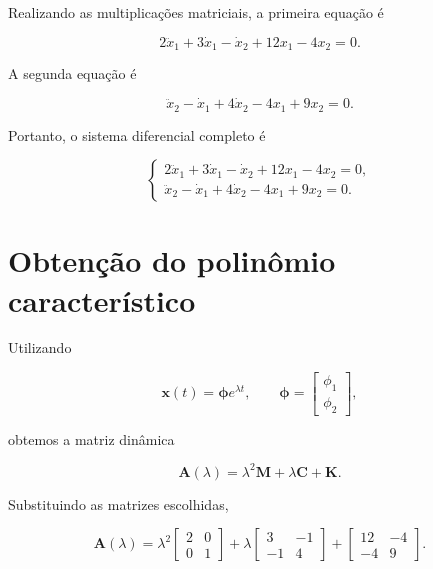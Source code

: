 \documentclass[12pt,a4paper]{article}
\begin{document}
Realizando as multiplicações matriciais, a primeira equação é

\begin{equation}
2\ddot{x}_1+3\dot{x}_1-\dot{x}_2+12x_1-4x_2=0.
\label{eq:eq1}
\end{equation}

A segunda equação é

\begin{equation}
\ddot{x}_2-\dot{x}_1+4\dot{x}_2-4x_1+9x_2=0.
\label{eq:eq2}
\end{equation}

Portanto, o sistema diferencial completo é

\begin{equation}
\boxed{
\begin{cases}
2\ddot{x}_1+3\dot{x}_1-\dot{x}_2+12x_1-4x_2=0,\\[2mm]
\ddot{x}_2-\dot{x}_1+4\dot{x}_2-4x_1+9x_2=0.
\end{cases}}
\end{equation}

\section{Obtenção do polinômio característico}

Utilizando

\begin{equation}
\mathbf{x}(t)=\boldsymbol{\phi}e^{\lambda t},
\qquad
\boldsymbol{\phi}
=
\begin{bmatrix}
\phi_1\\
\phi_2
\end{bmatrix},
\end{equation}

obtemos a matriz dinâmica

\begin{equation}
\mathbf{A}(\lambda)
=
\lambda^2\mathbf{M}
+\lambda\mathbf{C}
+\mathbf{K}.
\end{equation}

Substituindo as matrizes escolhidas,

\begin{equation}
\mathbf{A}(\lambda)
=
\lambda^2
\begin{bmatrix}
2 & 0\\
0 & 1
\end{bmatrix}
+
\lambda
\begin{bmatrix}
3 & -1\\
-1 & 4
\end{bmatrix}
+
\begin{bmatrix}
12 & -4\\
-4 & 9
\end{bmatrix}.
\end{equation}
\end{document}
